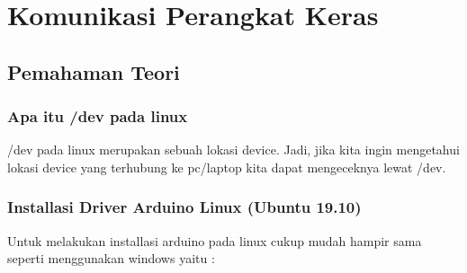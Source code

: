\chapter{Komunikasi Perangkat Keras}

\section{Pemahaman Teori}

\subsection{Apa itu /dev pada linux}
/dev pada linux merupakan sebuah lokasi device. Jadi, jika kita ingin mengetahui lokasi device yang terhubung ke pc/laptop kita dapat mengeceknya lewat /dev.

\subsection{Installasi Driver Arduino Linux (Ubuntu 19.10)}
Untuk melakukan installasi arduino pada linux cukup mudah hampir sama seperti menggunakan windows yaitu : 
